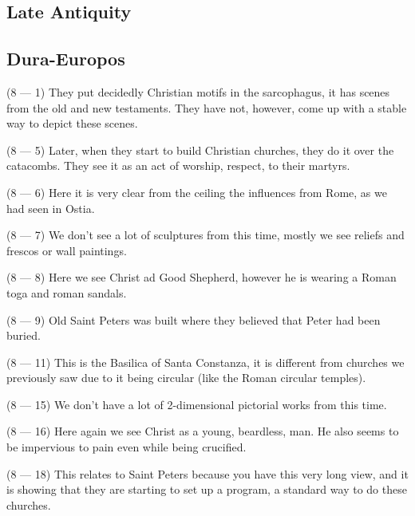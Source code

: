 \documentclass{article}
\begin{document}
    \begin{spacing}{1.2}
    \newpage
        \section{Late Antiquity}
        \subsection{Dura-Europos}

        (8 --- 1) They put decidedly Christian motifs in the sarcophagus, it has scenes from the old and new testaments. They have not, however, come up with a stable way to depict these scenes.
        
        (8 --- 5) Later, when they start to build Christian churches, they do it over the catacombs. They see it as an act of worship, respect, to their martyrs.
        
        (8 --- 6) Here it is very clear from the ceiling the influences from Rome, as we had seen in Ostia.

        (8 --- 7) We don't see a lot of sculptures from this time, mostly we see reliefs and frescos or wall paintings. 

        (8 --- 8) Here we see Christ ad Good Shepherd, however he is wearing a Roman toga and roman sandals. 

        (8 --- 9) Old Saint Peters was built where they believed that Peter had been buried. 

        (8 --- 11) This is the Basilica of Santa Constanza, it is different from churches we previously saw due to it being circular (like the Roman circular temples).

        (8 --- 15) We don't have a lot of 2-dimensional pictorial works from this time. 

        (8 --- 16) Here again we see Christ as a young, beardless, man. He also seems to be impervious to pain even while being crucified. 

        (8 --- 18) This relates to Saint Peters because you have this very long view, and it is showing that they are starting to set up a program, a standard way to do these churches.

    \end{spacing}
\end{document}
